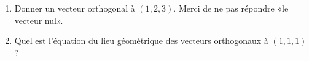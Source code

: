 
\begin{exercice}\label{exoOutilsMath-0016}

	\begin{enumerate}
		\item
			Donner un vecteur orthogonal à $(1,2,3)$. Merci de ne pas répondre «le vecteur nul».
		\item
			Quel est l'équation du lieu géométrique des vecteurs orthogonaux à $(1,1,1)$ ?
	\end{enumerate}

\end{exercice}
